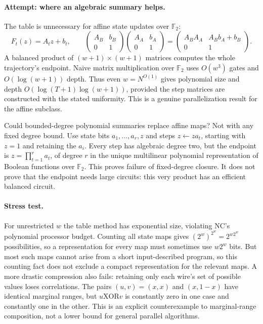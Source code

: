 \documentclass[11pt,a4paper]{article}
\newcommand{\F}{\mathbb{F}}
\begin{document}
\paragraph{Attempt: where an algebraic summary helps.}
The table is unnecessary for affine state updates over $\F_2$:
\[
 F_t(z)=A_tz+b_t,
 \qquad
 \begin{pmatrix}A_B&b_B\\0&1\end{pmatrix}
 \begin{pmatrix}A_A&b_A\\0&1\end{pmatrix}
 =\begin{pmatrix}A_BA_A&A_Bb_A+b_B\\0&1\end{pmatrix}.
 \tag{23.3}
\]
A balanced product of $(w+1)\times(w+1)$ matrices computes the whole
trajectory's endpoint. Naive matrix multiplication over $\F_2$ uses
$O(w^3)$ gates and $O(\log(w+1))$ depth. Thus even $w=N^{O(1)}$ gives
polynomial size and depth $O(\log(T+1)\log(w+1))$, provided the step
matrices are constructed with the stated uniformity. This is a genuine
parallelization result for the affine subclass.

Could bounded-degree polynomial summaries replace affine maps? Not with
any fixed degree bound. Use state bits $a_1,\ldots,a_r,z$ and steps
$z\leftarrow z a_t$, starting with $z=1$ and retaining the $a_i$.
Every step has algebraic degree two, but the endpoint is
$z=\prod_{t=1}^r a_t$, of degree $r$ in the unique multilinear polynomial
representation of Boolean functions over $\F_2$. This proves failure of
fixed-degree closure. It does not prove that the endpoint needs large
circuits: this very product has an efficient balanced circuit.

\paragraph{Stress test.}
For unrestricted $w$ the table method has exponential size, violating NC's
polynomial processor budget. Counting all state maps gives
$(2^w)^{2^w}=2^{w2^w}$ possibilities, so a representation for every map
must sometimes use $w2^w$ bits. But most such maps cannot arise from a
short input-described program, so this counting fact does not exclude a
compact representation for the relevant maps.
A more drastic compression also fails: retaining only each wire's set of
possible values loses correlations. The pairs $(u,v)=(x,x)$ and
$(x,1-x)$ have identical marginal ranges, but $u\mathbin{\mathrm{XOR}}v$
is constantly zero in one case and constantly one in the other.
This is an explicit counterexample to marginal-range composition, not a
lower bound for general parallel algorithms.
\end{document}
